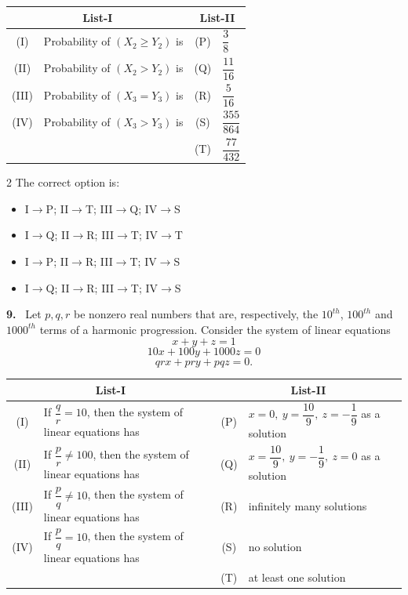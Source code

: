 \documentclass[10pt]{extarticle}
\newcommand{\qn}[1]{\par\smallskip\noindent\textbf{#1.}~}
\newenvironment{qoptions}{\begin{itemize}[leftmargin=1.8em,itemsep=1pt,topsep=2pt,label={}]}{\end{itemize}}
\newcommand{\opt}[2]{\item[(#1)] #2}
\begin{document}
\begin{center}
\begin{tabular}{|c|l|c|l|}
\hline
\multicolumn{2}{|c|}{List-I} & \multicolumn{2}{c|}{List-II} \\
\hline
(I) & Probability of $(X_2\ge Y_2)$ is & (P) & $\dfrac38$ \\
\hline
(II) & Probability of $(X_2> Y_2)$ is & (Q) & $\dfrac{11}{16}$ \\
\hline
(III) & Probability of $(X_3= Y_3)$ is & (R) & $\dfrac{5}{16}$ \\
\hline
(IV) & Probability of $(X_3> Y_3)$ is & (S) & $\dfrac{355}{864}$ \\
\hline
& & (T) & $\dfrac{77}{432}$ \\
\hline
\end{tabular}
\end{center}
\begin{multicols}{2}
The correct option is:
\begin{qoptions}
\opt{A}{I$\to$P; II$\to$T; III$\to$Q; IV$\to$S}
\opt{B}{I$\to$Q; II$\to$R; III$\to$T; IV$\to$T}
\opt{C}{I$\to$P; II$\to$R; III$\to$T; IV$\to$S}
\opt{D}{I$\to$Q; II$\to$R; III$\to$T; IV$\to$S}
\end{qoptions}

\qn{9} Let $p,q,r$ be nonzero real numbers that are, respectively, the $10^{th}$, $100^{th}$ and $1000^{th}$ terms of a harmonic progression. Consider the system of linear equations
$$x+y+z=1$$
$$10x+100y+1000z=0$$
$$qrx+pry+pqz=0.$$
\end{multicols}
\begin{center}
\begin{tabular}{|c|p{5cm}|c|l|}
\hline
\multicolumn{2}{|c|}{List-I} & \multicolumn{2}{c|}{List-II} \\
\hline
(I) & If $\dfrac{q}{r}=10$, then the system of linear equations has & (P) & $x=0,\ y=\dfrac{10}{9},\ z=-\dfrac19$ as a solution \\
\hline
(II) & If $\dfrac{p}{r}\ne100$, then the system of linear equations has & (Q) & $x=\dfrac{10}{9},\ y=-\dfrac19,\ z=0$ as a solution \\
\hline
(III) & If $\dfrac{p}{q}\ne10$, then the system of linear equations has & (R) & infinitely many solutions \\
\hline
(IV) & If $\dfrac{p}{q}=10$, then the system of linear equations has & (S) & no solution \\
\hline
& & (T) & at least one solution \\
\hline
\end{tabular}
\end{center}
\end{document}
